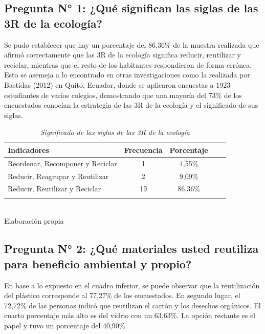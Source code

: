 {\setlength{\parskip}{0cm}
\subsection{Pregunta N° 1: ¿Qué significan las siglas de las 3R de la ecología?}

Se pudo establecer que hay un porcentaje del 86.36\% de la muestra realizada que afirmó correctamente que las 3R de la ecología significa reducir, reutilizar y reciclar, mientras que el resto de los habitantes respondieron de forma errónea. Esto se asemeja a lo encontrado en otras investigaciones como la realizada por Bastidas (2012) en Quito, Ecuador, donde se aplicaron encuestas a 1923 estudiantes de varios colegios, demostrando que una mayoría del 73\% de los encuestados conocían la estrategia de las 3R de la ecología y el significado de sus siglas.
}

\begin{table}[h!]
    \centering
    \captionsetup{singlelinecheck=false, justification=raggedright, labelsep=newline}
    \caption{\textit{Significado de las siglas de las 3R de la ecología}}
    \begin{tabular}{lcccc}
        \toprule
        Indicadores & Frecuencia & Porcentaje\\
        \midrule
        Reordenar, Recomponer y Reciclar & 1 & 4,55\%\\
        Reducir, Reagrupar y Reutilizar & 2 & 9,09\% \\
        Reducir, Reutilizar y Reciclar & 19 & 86,36\% \\ 
        \bottomrule
        \\
    \end{tabular}
    \\\RaggedRight Elaboración propia
    \label{table:cuadro9}
\end{table}

{\setlength{\parskip}{0cm}
\subsection{Pregunta N° 2: ¿Qué materiales usted reutiliza para beneficio ambiental y propio?}

En base a lo expuesto en el cuadro inferior, se puede observar que la reutilización del plástico corresponde al 77,27\% de los encuestados. En segundo lugar, el 72,72\% de las personas indicó que reutilizan el cartón y los desechos orgánicos. El cuarto porcentaje más alto es del vidrio con un 63,63\%. La opción restante es el papel y tuvo un porcentaje del 40,90\%.
}

